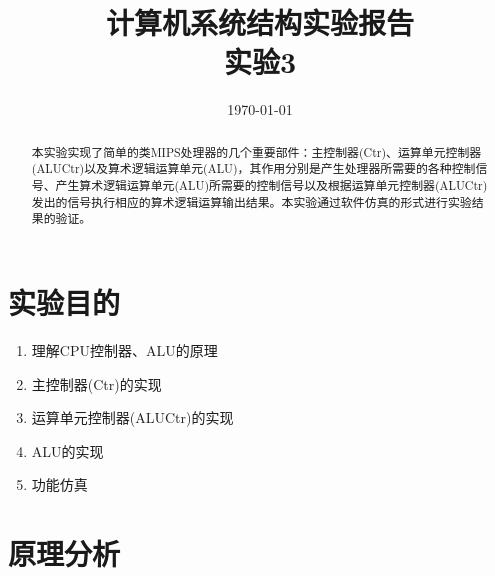 \documentclass[UTF8]{ctexart}
\title{计算机系统结构实验报告\\实验3}
\date{\today}
\begin{document}
\maketitle
\begin{abstract}
    本实验实现了简单的类MIPS处理器的几个重要部件：主控制器(Ctr)、运算单元控制器(ALUCtr)以及算术逻辑运算单元(ALU)，其作用分别是产生处理器所需要的各种控制信号、产生算术逻辑运算单元(ALU)所需要的控制信号以及根据运算单元控制器(ALUCtr)发出的信号执行相应的算术逻辑运算输出结果。本实验通过软件仿真的形式进行实验结果的验证。
\end{abstract}
\tableofcontents
\clearpage
\section{实验目的}
\begin{enumerate}
    \item 理解CPU控制器、ALU的原理
    \item 主控制器(Ctr)的实现
    \item 运算单元控制器(ALUCtr)的实现
    \item ALU的实现
    \item 功能仿真
\end{enumerate}
\section{原理分析}\label{sec1}
\end{document}

